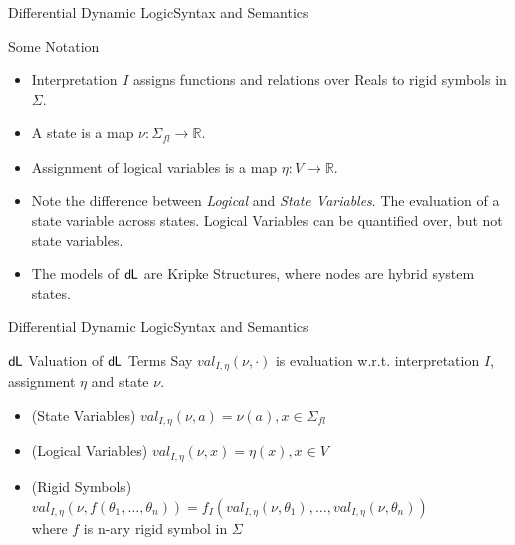 \documentclass{beamer}
\newcommand{\dL}{\text{\upshape\textsf{d{\kern-0.05em}L}}}
\newcommand{\R}{\mathbb{R}}
\newcommand{\val}[4]{\textit{val}_{#1, #2}(#3, #4)}
\newcommand{\valDefault}[1]{\val{I}{\eta}{\nu}{#1}}
\begin{document}
\begin{frame}{Differential Dynamic Logic}{Syntax and Semantics}
  \begin{block}{Some Notation}
    \begin{itemize}
      \item Interpretation $I$ assigns functions and relations over Reals to
        rigid symbols in $\Sigma$.
      \item A state is a map $\nu : \Sigma_{\textit{fl}} \to \R$.
      \item Assignment of logical variables is a map $\eta : V \to \R$.
      \item Note the difference between \textit{Logical} and \textit{State
        Variables}. The evaluation of a state variable  across
        states. Logical Variables can be quantified over, but not state
        variables.
      \item The models of $\dL$ are Kripke Structures, where nodes are
        hybrid system states.
    \end{itemize}
  \end{block}
\end{frame}

\begin{frame}{Differential Dynamic Logic}{Syntax and Semantics}
    \begin{block}{$\dL$ Valuation of $\dL$ Terms}
      Say $\valDefault{\cdot}$ is evaluation w.r.t. interpretation $I$, assignment $\eta$ and state $\nu$.
      \pause
      \begin{itemize}
      \item (State Variables) $\valDefault{a} = \nu(a), x \in \Sigma_{\textit{fl}}$
        \pause
      \item (Logical Variables) $\valDefault{x} = \eta(x), x \in V$
        \pause
      \item (Rigid Symbols) $\valDefault{f(\theta_1, \ldots, \theta_n)} =
          f_I(\valDefault{\theta_1}, \ldots, \valDefault{\theta_n})$ \\
          where $f$ is n-ary rigid symbol in $\Sigma$
      \end{itemize}
    \end{block}
\end{frame}
\end{document}
